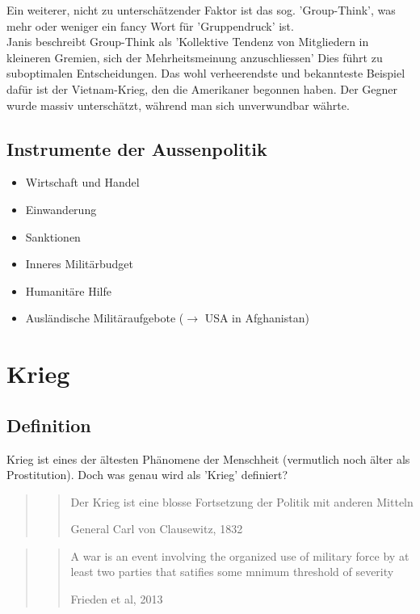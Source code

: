 \documentclass[a4paper, 11pt]{article}
\begin{document}
Ein weiterer, nicht zu unterschätzender Faktor ist das sog. 'Group-Think', was mehr oder weniger ein fancy Wort für 'Gruppendruck' ist. \\ 
Janis beschreibt Group-Think als 'Kollektive Tendenz von Mitgliedern in kleineren Gremien, sich der Mehrheitsmeinung anzuschliessen' Dies führt zu suboptimalen Entscheidungen. Das wohl verheerendste und bekannteste Beispiel dafür ist der Vietnam-Krieg, den die Amerikaner begonnen haben. Der Gegner wurde massiv unterschätzt, während man sich unverwundbar währte.

\subsection{Instrumente der Aussenpolitik}

\begin{multicols}{2}
	\begin{itemize}
		\item Wirtschaft und Handel
		\item Einwanderung
		\item Sanktionen
		\item Inneres Militärbudget
		\item Humanitäre Hilfe
		\item Ausländische Militäraufgebote ($\rightarrow$  USA in Afghanistan)
	\end{itemize}
\end{multicols}

\section{Krieg} \label{sec:war}

\subsection{Definition}
Krieg ist eines der ältesten Phänomene der Menschheit (vermutlich noch älter als Prostitution). Doch was genau wird als 'Krieg' definiert?

\begin{quote}
	\centering
	\blockquote[General Carl von Clausewitz, 1832]{Der Krieg ist eine blosse Fortsetzung der Politik mit anderen Mitteln}
\end{quote}

\begin{quote}
	\centering
	\blockquote[Frieden et al, 2013]{A war is an event involving the organized use of military force by at least two parties that satifies some mnimum threshold of severity}
\end{quote}
\end{document}
